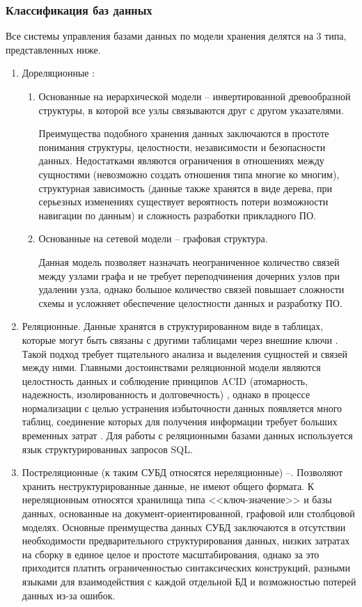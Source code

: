 \subsubsection{Классификация баз данных}
Все системы управления базами данных по модели хранения делятся на 3 типа, представленных ниже.
\begin{enumerate}
	\item Дореляционные \cite{DBIngeneering}:
		\begin{enumerate}
			\item Основанные на иерархической модели -- инвертированной древообразной структуры, в которой все узлы связываются друг с другом указателями.
			
			Преимущества подобного хранения данных заключаются в простоте понимания структуры, целостности, независимости и безопасности данных. Недостатками являются ограничения в отношениях между сущностями (невозможно создать отношения типа многие ко многим), структурная зависимость (данные также хранятся в виде дерева, при серьезных изменениях существует вероятность потери возможности навигации по данным) и сложность разработки прикладного ПО.
			
			\item Основанные на сетевой модели -- графовая структура.
			
			Данная модель позволяет назначать неограниченное количество связей между узлами графа и не требует переподчинения дочерних узлов при удалении узла, однако большое количество связей повышает сложности схемы и усложняет обеспечение целостности данных и разработку ПО.
		\end{enumerate}
	\item Реляционные. Данные хранятся в структурированном виде в таблицах, которые могут быть связаны с другими таблицами через внешние ключи \cite{OverviewDMS}. Такой подход требует тщательного анализа и выделения сущностей и связей между ними. Главными достоинствами реляционной модели являются целостность данных и соблюдение принципов ACID (атомарность, надежность, изолированность и долговечность) \cite{relativeNonRelative}, однако в процессе нормализации с целью устранения избыточности данных появляется много таблиц, соединение которых для получения информации требует больших временных затрат \cite{DBIngeneering}. Для работы с реляционными базами данных используется язык структурированных запросов SQL.
	\item Постреляционные (к таким СУБД относятся нереляционные) \cite{DBIngeneering}--\cite{relativeNonRelative}. Позволяют хранить неструктурированные данные, не имеют общего формата. К нереляционным относятся хранилища типа <<ключ-значение>> и базы данных, основанные на документ-ориентированной, графовой или столбцовой моделях. Основные преимущества данных СУБД заключаются в отсутствии необходимости предварительного структурирования данных, низких затратах на сборку в единое целое и простоте масштабирования, однако за это приходится платить ограниченностью синтаксических конструкций, разными языками для взаимодействия с каждой отдельной БД и возможностью потерей данных из-за ошибок.
\end{enumerate}
